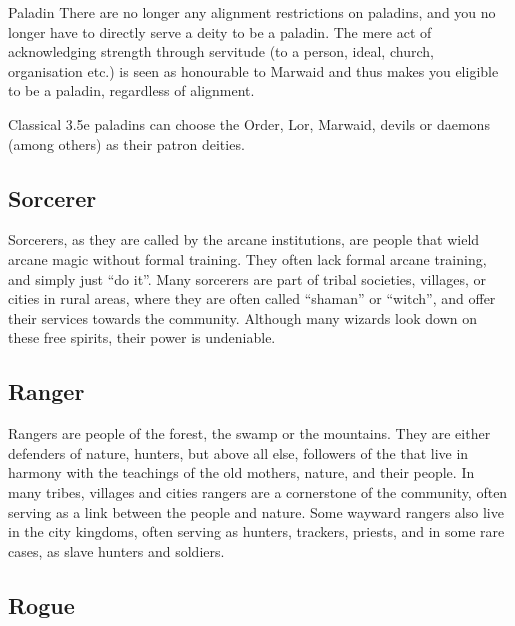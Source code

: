 \begin{35e}{Paladin}
  There are no longer any alignment restrictions on paladins, and you no longer
  have to directly serve a deity to be a paladin. The mere act of acknowledging
  strength through servitude (to a person, ideal, church, organisation etc.) is
  seen as honourable to Marwaid and thus makes you eligible to be a paladin,
  regardless of alignment.

  Classical 3.5e paladins can choose the Order, Lor, Marwaid, devils or
  daemons (among others) as their patron deities.
\end{35e}

\subsection{Sorcerer}
\label{sec:Sorcerer}

Sorcerers, as they are called by the arcane institutions, are people that wield
arcane magic without formal training. They often lack formal arcane training,
and simply just ``do it''. Many sorcerers are part of tribal societies,
villages, or cities in rural areas, where they are often called ``shaman'' or
``witch'', and offer their services towards the community. Although many wizards
look down on these free spirits, their power is undeniable.


\subsection{Ranger}
\label{sec:Ranger}

Rangers are people of the forest, the swamp or the mountains. They are either
defenders of nature, hunters, but above all else, followers of the
 that live in harmony with the teachings of the old
mothers, nature, and their people. In many tribes, villages and cities rangers
are a cornerstone of the community, often serving as a link between the people
and nature. Some wayward rangers also live in the city kingdoms, often serving
as hunters, trackers, priests, and in some rare cases, as slave hunters and
soldiers.


\subsection{Rogue}
\label{sec:Rogue}

